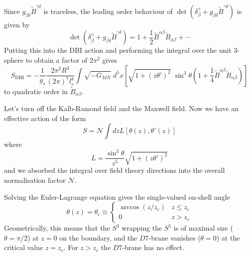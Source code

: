 \documentclass[aps,preprint,nofootinbib,preprintnumbers,eqsecnum,superscriptaddress]{revtex4}
\begin{document}
\begin{appendix}
Since $g_{\beta \delta} \tilde{B}^{\gamma \delta}$ is traceless, the leading order behaviour of $\det(\delta^\gamma_\beta + g_{\beta \delta} \tilde{B}^{\gamma \delta})$ is given by
\begin{equation}
\det(\delta^\gamma_\beta + g_{\beta \delta} \tilde{B}^{\gamma \delta})
= 1 + \frac{1}{2} \tilde{B}^{\alpha \beta}\tilde{B}_{\alpha \beta} + \cdots
\end{equation}
Putting this into the DBI action and performing the integral over the unit $3$-sphere to obtain a factor of $2\pi^2$ gives
\begin{equation}
S_{\text{DBI}}
= -\frac{1}{g_s}\frac{2 \pi^2 R^3}{(2\pi)^7 l_s^8} \int{\sqrt{-G_{MN}}\; d^5 x \left[\sqrt{1 + (z\theta')^2} \; \sin^3{\theta}\left(1 + \frac{1}{4}\tilde{B}^{\alpha \beta}\tilde{B}_{\alpha \beta}\right)\right]}
\end{equation}
to quadratic order in $\tilde{B}_{\alpha \beta}$.

Let's turn off the Kalb-Ramond field and the Maxwell field. Now we have an effective action of the form
\begin{equation}
S = \mathcal{N}\int{dz L[\theta(z), \theta'(z)]}
\end{equation}
where
\begin{equation}
	L = \frac{\sin^3{\theta}}{z^5}\sqrt{1 + (z\theta')^2}
\end{equation}
and we absorbed the integral over field theory directions into the overall normalisation factor $\mathcal{N}$.

Solving the Euler-Lagrange equation gives the single-valued on-shell angle
\begin{equation}
\theta(z) = \theta_c \equiv
\begin{cases} 
	\arccos(z/z_c)	& z\leq z_c \\
	0				& z > z_c
	\end{cases}
\end{equation}
Geometrically, this means that the $S^3$ wrapping the $S^5$ is of maximal size ($\theta=\pi/2$) at $z=0$ on the boundary, and the $D7$-brane vanishes ($\theta =0$) at the critical value $z=z_c$. For $z>z_c$ the $D7$-brane has no effect.	


\end{appendix}
\end{document}
